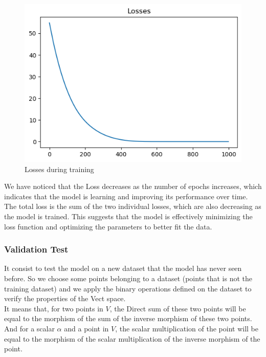 \documentclass{report}
\begin{document}
            \begin{figure}[h]
                \centering
                \includegraphics[width=\textwidth]{./images/losses.png}
                \caption{Losses during training}
                \label{fig:losses}
            \end{figure}

            \newpage


            We have noticed that the Loss decreases as the number of epochs increases, which indicates that the model is learning and improving its performance over time. The total loss is the sum of the two individual losses, which are also decreasing as the model is trained. This suggests that the model is effectively minimizing the loss function and optimizing the parameters to better fit the data.

        \subsubsection{Validation Test}
            It consist to test the model on a new dataset that the model has never seen before. So we choose some points belonging to a dataset (points that is not the training dataset) and we apply the binary operations defined on the dataset to verify the properties of the Vect space. \\
            It means that, for two points in $V$, the Direct sum of these two points will be equal to the morphism of the sum of the inverse morphism of these two points. And for a scalar $\alpha$ and a point in $V$, the scalar multiplication of the point will be equal to the morphism of the scalar multiplication of the inverse morphism of the point.
\end{document}
